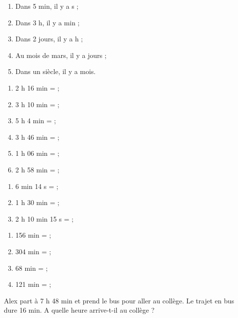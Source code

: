 \documentclass[11pt]{article}
\begin{document}
\phantom{0}
\vspace{-1cm}
\begin{multicols}{2}
\begin{exercice}
\begin{enumerate}
\item Dans 5 min, il y a \dotfill s ;
\item Dans 3 h, il y a \dotfill min ;
\item Dans 2 jours, il y a \dotfill h ;
\item Au mois de mars, il y a \dotfill jours ;
\item Dans un siècle, il y a \dotfill mois.
\end{enumerate}
\end{exercice}

\begin{exercice}
\begin{enumerate}
\item 2 h 16 min = \dotfill ;
\item 3 h 10 min = \dotfill ;
\item 5 h 4 min = \dotfill ;
\item 3 h 46 min = \dotfill ;
\item 1 h 06 min = \dotfill ;
\item 2 h 58 min = \dotfill ;
\end{enumerate}
\end{exercice}

\begin{exercice}
\begin{enumerate}
\item 6 min 14 s = \dotfill ;
\item 1 h 30 min = \dotfill ;
\item 2 h 10 min 15 s = \dotfill ;
\end{enumerate}
\end{exercice}

\begin{exercice}
\begin{enumerate}
\item 156 min = \dotfill ;
\item 304 min = \dotfill ;
\item 68 min = \dotfill ;
\item 121 min = \dotfill ;
\end{enumerate}
\end{exercice}

\begin{exercice}[3]
Alex part à 7 h 48 min et prend le bus pour aller au collège. Le
trajet en bus dure 16 min. A quelle heure arrive-t-il au collège ? \\ \dtf
\end{exercice}
\end{multicols}
\end{document}
